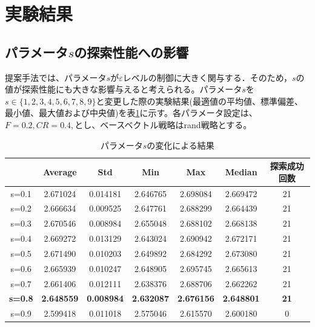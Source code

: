 \documentclass[a4paper,12pt]{jsreport}
\begin{document}
\section{実験結果}

\subsection{パラメータ$s$の探索性能への影響}
提案手法では、パラメータ$s$が$\varepsilon$レベルの制御に大きく関与する．そのため，$s$の値が探索性能にも大きな影響与えると考えられる。パラメータ$s$を$s \in \{1,2,3,4,5,6,7,8,9 \}$と変更した際の実験結果(最適値の平均値、標準偏差、最小値、最大値および中央値)を表\ref{tbl:s}に示す。各パラメータ設定は、$F=0.2,CR=0.4,$とし、ベースベクトル戦略はrand戦略とする。

\begin{table}[htbp]
\begin{center}
\caption{パラメータ$s$の変化による結果}
\label{tbl:s}
\begin{tabular}{|c|c|c|c|c|c|c|}
\hline
      & Average & Std & Min & Max & Median &  探索成功回数\\ \hline
s=0.1 & 2.671024 & 0.014181 & 2.646765 & 2.698084 & 2.669472 & 21 \\ \hline
s=0.2 & 2.666634 & 0.009525 & 2.647761 & 2.688299 & 2.664439 & 21 \\ \hline
s=0.3 & 2.670546 & 0.008984 & 2.655048 & 2.688102 & 2.668138 & 21 \\ \hline
s=0.4 & 2.669272 & 0.013129 & 2.643024 & 2.690942 & 2.672171 & 21 \\ \hline
s=0.5 & 2.671490 & 0.010203 & 2.649892 & 2.684292 & 2.673080 & 21 \\ \hline
s=0.6 & 2.665939 & 0.010247 & 2.648905 & 2.695745 & 2.665613 & 21 \\ \hline
s=0.7 & 2.661406 & 0.012111 & 2.638376 & 2.688706 & 2.662262 & 21 \\ \hline
\bf s=0.8 &\bf 2.648559 &\bf 0.008984 &\bf 2.632087 &\bf 2.676156 &\bf 2.648801 &\bf 21 \\ \hline
s=0.9 & 2.599418 & 0.011018 & 2.575046 & 2.615570 & 2.600180 & 0 \\ \hline
\end{tabular}
\end{center}
\end{table}
\end{document}
